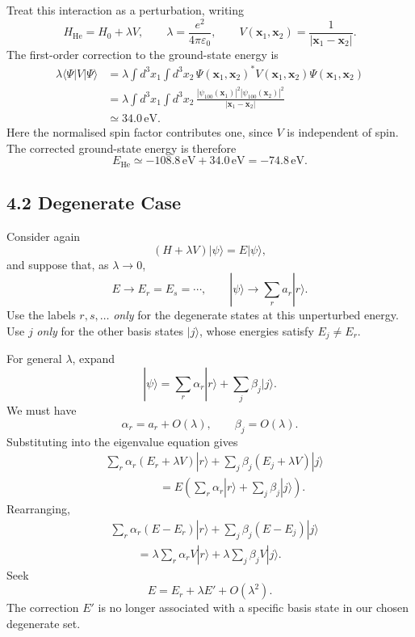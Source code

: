 \documentclass[11pt,a4paper]{article}
\begin{document}
Treat this interaction as a perturbation, writing
\[
    H_{\mathrm{He}}=H_0+\lambda V,
    \qquad
    \lambda=\frac{e^2}{4\pi\varepsilon_0},
    \qquad
    V(\mathbf x_1,\mathbf x_2)=\frac{1}{|\mathbf x_1-\mathbf x_2|}.
\]
The first-order correction to the ground-state energy is
\begin{align*}
    \lambda\langle\Psi|V|\Psi\rangle
      &=\lambda\int d^3x_1\int d^3x_2\,
          \Psi(\mathbf x_1,\mathbf x_2)^*
          V(\mathbf x_1,\mathbf x_2)
          \Psi(\mathbf x_1,\mathbf x_2)\\
      &=\lambda\int d^3x_1\int d^3x_2\,
        \frac{|\psi_{100}(\mathbf x_1)|^2
              |\psi_{100}(\mathbf x_2)|^2}
             {|\mathbf x_1-\mathbf x_2|}\\
      &\simeq34.0\,\mathrm{eV}.
\end{align*}
Here the normalised spin factor contributes one, since $V$ is
independent of spin. The corrected ground-state energy is therefore
\[
    E_{\mathrm{He}}\simeq-108.8\,\mathrm{eV}+34.0\,\mathrm{eV}
       =-74.8\,\mathrm{eV}.
\]

\subsection*{4.2 Degenerate Case}

Consider again
\[
    (H+\lambda V)|\psi\rangle=E|\psi\rangle,
\]
and suppose that, as $\lambda\to0$,
\[
    E\to E_r=E_s=\cdots,
    \qquad
    |\psi\rangle\to\sum_r a_r|r\rangle.
\]
Use the labels $r,s,\ldots$ \emph{only} for the degenerate states at
this unperturbed energy. Use $j$ \emph{only} for the other basis states
$|j\rangle$, whose energies satisfy $E_j\ne E_r$.

For general $\lambda$, expand
\[
    |\psi\rangle=\sum_r\alpha_r|r\rangle
                 +\sum_j\beta_j|j\rangle.
\]
We must have
\[
    \alpha_r=a_r+O(\lambda),
    \qquad \beta_j=O(\lambda).
\]
Substituting into the eigenvalue equation gives
\begin{align*}
    &\sum_r\alpha_r(E_r+\lambda V)|r\rangle
     +\sum_j\beta_j(E_j+\lambda V)|j\rangle\\
    &\hspace{2cm}
      =E\left(\sum_r\alpha_r|r\rangle
                 +\sum_j\beta_j|j\rangle\right).
\end{align*}
Rearranging,
\begin{equation}
    \begin{aligned}
        &\sum_r\alpha_r(E-E_r)|r\rangle
          +\sum_j\beta_j(E-E_j)|j\rangle\\
        &\hspace{1cm}
          =\lambda\sum_r\alpha_r V|r\rangle
           +\lambda\sum_j\beta_j V|j\rangle.
    \end{aligned}
    \tag{$**$}
\end{equation}
Seek
\[
    E=E_r+\lambda E'+O(\lambda^2).
\]
The correction $E'$ is no longer associated with a specific basis
state in our chosen degenerate set.
\end{document}
